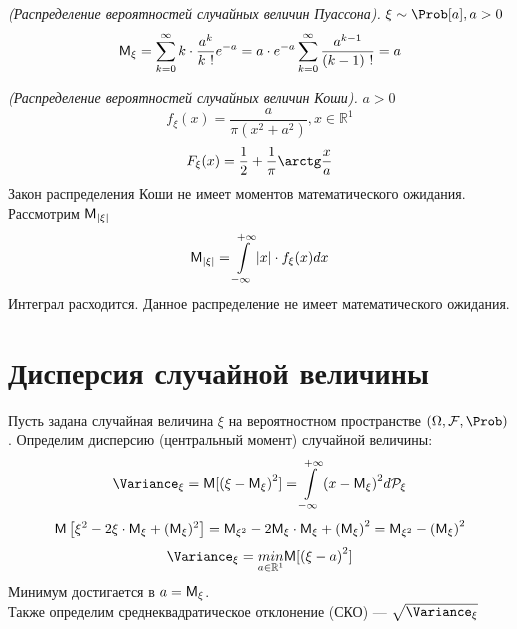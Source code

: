\begin{example} \textit{(Распределение вероятностей случайных величин Пуассона).} $\xi \sim \Prob [a], a > 0$
  \[
    \mathsf{M}_{\xi} = \sum\limits_{k = 0}^{\infty} k \cdot \frac{a^k}{k \ !} e^{-a} = a \cdot e^{-a} \sum\limits_{k = 0}^{\infty} \frac{a^{k-1}}{(k-1) \ !} = a
  \]
\end{example}
\begin{example} \textit{(Распределение вероятностей случайных величин Коши).}
  $a > 0$
  \[
    f_{\xi} (x) = \frac{a}{\pi (x^2 + a^2)}, x \in \mathbb{R}^1
  \]
  \[
    F_{\xi} (x) = \frac{1}{2} + \frac{1}{\pi} \arctg \frac{x}{a}
  \]
  Закон распределения Коши не имеет моментов математического ожидания. Рассмотрим $\mathsf{M}_{|\xi|}$
  \[
    \mathsf{M}_{|\xi|} = \int\limits_{-\infty}^{+\infty} |x| \cdot f_{\xi} (x) dx
  \]
  Интеграл расходится. Данное распределение не имеет математического ожидания.
\end{example}

\setcounter{equation}{0}
\section{Дисперсия случайной величины}
Пусть задана случайная величина $\xi$ на вероятностном пространстве $(\Omega, \mathcal{F}, \Prob)$. Определим дисперсию (центральный момент) случайной величины:
\[
  \Variance_{\xi} = \MExpect [ {(\xi - \MExpect_{\xi})}^2] = \int\limits_{-\infty}^{+\infty} {(x - \MExpect_{\xi})}^2 d \mathcal{P}_{\xi}
\]
\[
  \mathsf{M} \left[ \xi^2 - 2 \xi \cdot \mathsf{M}_{\xi} + (\mathsf{M}_{\xi})^2 \right] = \mathsf{M}_{\xi^2} - 2 \mathsf{M}_{\xi} \cdot \mathsf{M}_{\xi} + {(\mathsf{M}_{\xi})}^2 = \mathsf{M}_{\xi^2} - {(\mathsf{M}_{\xi})}^2
\]
\[
  \Variance_{\xi} = \underset{a \in \mathbb{R}^1}{min} \MExpect [{(\xi - a)}^2]
\]
Минимум достигается в $a = \mathsf{M}_{\xi}$. \\
Также определим среднеквадратическое отклонение (СКО) --- $\sqrt{\Variance_{\xi}}$
